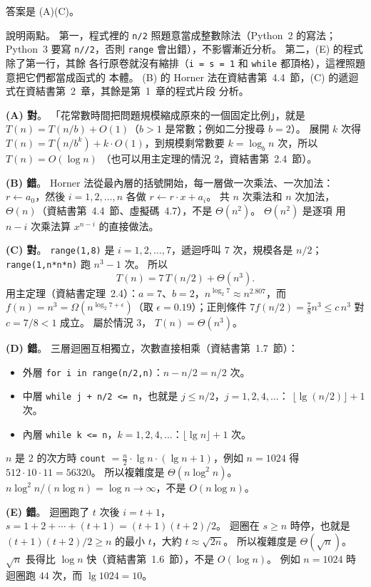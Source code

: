 \begin{pastsoln}
答案是 (A)(C)。

說明兩點。 第一，程式裡的 \texttt{n/2} 照題意當成整數除法（Python~2 的寫法；Python~3 要寫
\texttt{n//2}，否則 \texttt{range} 會出錯），不影響漸近分析。 第二，(E) 的程式除了第一行，其餘
各行原卷就沒有縮排（\texttt{i = s = 1} 和 \texttt{while} 都頂格），這裡照題意把它們都當成函式的
本體。 (B) 的 Horner 法在資結書第~4.4~節，(C) 的遞迴式在資結書第~2~章，其餘是第~1~章的程式片段
分析。

\textbf{(A) 對}。 「花常數時間把問題規模縮成原來的一個固定比例」，就是
$T(n) = T(n/b) + O(1)$（$b > 1$ 是常數；例如二分搜尋 $b = 2$）。 展開 $k$ 次得
$T(n) = T(n/b^k) + k \cdot O(1)$，到規模剩常數要 $k = \log_b n$ 次，所以 $T(n) = O(\log n)$
（也可以用主定理的情況 2，資結書第~2.4~節）。

\textbf{(B) 錯}。 Horner 法從最內層的括號開始，每一層做一次乘法、一次加法：
$r \gets a_0$，然後 $i = 1, 2, \ldots, n$ 各做 $r \gets r \cdot x + a_i$。 共 $n$ 次乘法和 $n$
次加法，$\Theta(n)$（資結書第~4.4~節、虛擬碼~4.7），不是 $\Theta(n^2)$。 $\Theta(n^2)$ 是逐項
用 $n - i$ 次乘法算 $x^{n-i}$ 的直接做法。

\textbf{(C) 對}。 \texttt{range(1,8)} 是 $i = 1, 2, \ldots, 7$，遞迴呼叫 $7$ 次，規模各是 $n/2$；
\texttt{range(1,n*n*n)} 跑 $n^3 - 1$ 次。 所以
\[
T(n) = 7\,T(n/2) + \Theta(n^3).
\]
用主定理（資結書定理~2.4）：$a = 7$、$b = 2$，$n^{\log_2 7} \approx n^{2.807}$，而
$f(n) = n^3 = \Omega(n^{\log_2 7 + \epsilon})$（取 $\epsilon = 0.19$）；正則條件
$7 f(n/2) = \frac{7}{8} n^3 \le c\,n^3$ 對 $c = 7/8 < 1$ 成立。 屬於情況 3，
$T(n) = \Theta(n^3)$。

\textbf{(D) 錯}。 三層迴圈互相獨立，次數直接相乘（資結書第~1.7~節）：
\begin{itemize}
\item 外層 \texttt{for i in range(n/2,n)}：$n - n/2 = n/2$ 次。
\item 中層 \texttt{while j + n/2 <= n}，也就是 $j \le n/2$，$j = 1, 2, 4, \ldots$：
$\lfloor \lg(n/2) \rfloor + 1$ 次。
\item 內層 \texttt{while k <= n}，$k = 1, 2, 4, \ldots$：$\lfloor \lg n \rfloor + 1$ 次。
\end{itemize}
$n$ 是 $2$ 的次方時 \texttt{count} $= \frac{n}{2} \cdot \lg n \cdot (\lg n + 1)$，例如 $n = 1024$ 得
$512 \cdot 10 \cdot 11 = 56320$。 所以複雜度是 $\Theta(n \log^2 n)$。 $n \log^2 n / (n \log n) =
\log n \to \infty$，不是 $O(n \log n)$。

\textbf{(E) 錯}。 迴圈跑了 $t$ 次後 $i = t + 1$，$s = 1 + 2 + \cdots + (t + 1) = (t+1)(t+2)/2$。
迴圈在 $s \ge n$ 時停，也就是 $(t+1)(t+2)/2 \ge n$ 的最小 $t$，大約 $t \approx \sqrt{2n}$。
所以複雜度是 $\Theta(\sqrt{n})$。 $\sqrt{n}$ 長得比 $\log n$ 快（資結書第~1.6~節），不是
$O(\log n)$。 例如 $n = 1024$ 時迴圈跑 $44$ 次，而 $\lg 1024 = 10$。
\end{pastsoln}
